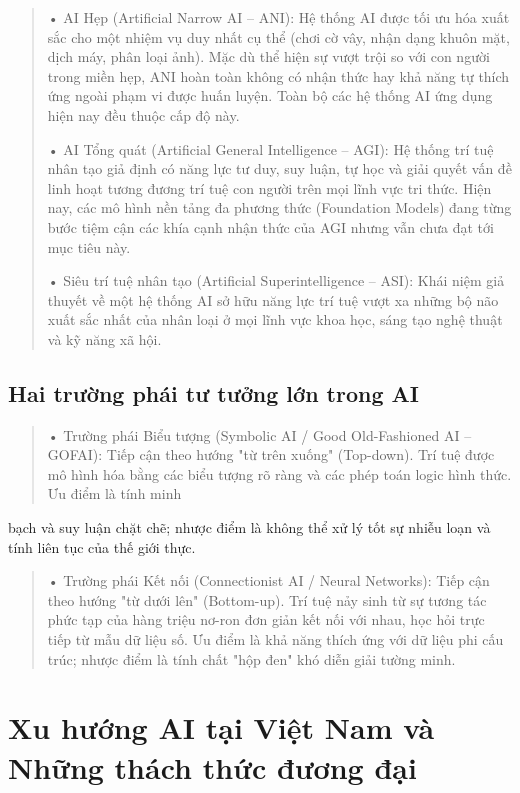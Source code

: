 \begin{quote}
• AI Hẹp (Artificial Narrow AI -- ANI): Hệ thống AI được tối ưu hóa xuất
sắc cho một nhiệm vụ duy nhất cụ thể (chơi cờ vây, nhận dạng khuôn mặt,
dịch máy, phân loại ảnh). Mặc dù thể hiện sự vượt trội so với con người
trong miền hẹp, ANI hoàn toàn không có nhận thức hay khả năng tự thích
ứng ngoài phạm vi được huấn luyện. Toàn bộ các hệ thống AI ứng dụng hiện
nay đều thuộc cấp độ này.

• AI Tổng quát (Artificial General Intelligence -- AGI): Hệ thống trí
tuệ nhân tạo giả định có năng lực tư duy, suy luận, tự học và giải quyết
vấn đề linh hoạt tương đương trí tuệ con người trên mọi lĩnh vực tri
thức. Hiện nay, các mô hình nền tảng đa phương thức (Foundation Models)
đang từng bước tiệm cận các khía cạnh nhận thức của AGI nhưng vẫn chưa
đạt tới mục tiêu này.

• Siêu trí tuệ nhân tạo (Artificial Superintelligence -- ASI): Khái niệm
giả thuyết về một hệ thống AI sở hữu năng lực trí tuệ vượt xa những bộ
não xuất sắc nhất của nhân loại ở mọi lĩnh vực khoa học, sáng tạo nghệ
thuật và kỹ năng xã hội.
\end{quote}

\subsection{Hai trường phái tư tưởng lớn trong AI}\label{hai-trux1b0ux1eddng-phuxe1i-tux1b0-tux1b0ux1edfng-lux1edbn-trong-ai}

\begin{quote}
• Trường phái Biểu tượng (Symbolic AI / Good Old-Fashioned AI -- GOFAI):
Tiếp cận theo hướng "từ trên xuống" (Top-down). Trí tuệ được mô hình hóa
bằng các biểu tượng rõ ràng và các phép toán logic hình thức. Ưu điểm là
tính minh
\end{quote}

bạch và suy luận chặt chẽ; nhược điểm là không thể xử lý tốt sự nhiễu
loạn và tính liên tục của thế giới thực.

\begin{quote}
• Trường phái Kết nối (Connectionist AI / Neural Networks): Tiếp cận
theo hướng "từ dưới lên" (Bottom-up). Trí tuệ nảy sinh từ sự tương tác
phức tạp của hàng triệu nơ-ron đơn giản kết nối với nhau, học hỏi trực
tiếp từ mẫu dữ liệu số. Ưu điểm là khả năng thích ứng với dữ liệu phi
cấu trúc; nhược điểm là tính chất "hộp đen" khó diễn giải tường minh.
\end{quote}

\section{Xu hướng AI tại Việt Nam và Những thách thức đương đại}\label{xu-hux1b0ux1edbng-ai-tux1ea1i-viux1ec7t-nam-vuxe0-nhux1eefng-thuxe1ch-thux1ee9c-ux111ux1b0ux1a1ng-ux111ux1ea1i}

